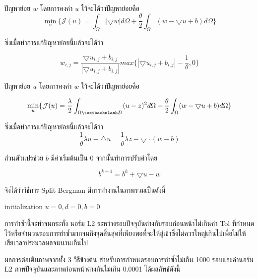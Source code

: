 \documentclass[hidelinks,a4paper,14pt]{article}
\numberwithin{equation}{section}							%
\begin{document}
{ปัญหาย่อย $w$ โดยการคงค่า $u$ ไว้จะได้ว่าปัญหาย่อยคือ
$$\min_{u} \{ \mathcal{J}(u) =  \int_{\Omega}  |\bigtriangledown w|  d\Omega + \frac{\theta}{2} \int_{\Omega} (w - \bigtriangledown u + b) d\Omega \}$$

ซึ่งเมื่อทำการแก้ปัญหาย่อยนี้แล้วจะได้ว่า

$$ w_{i,j} = \frac{\bigtriangledown u_{i,j}  + b_{i,j} }{ | \bigtriangledown u_{i,j}  + b_{i,j} | } max \{  | \bigtriangledown u_{i,j}  + b_{i,j} | - \frac{1}{\theta} , 0\} $$

ปัญหาย่อย $u$ โดยการคงค่า $w$ ไว้จะได้ว่าปัญหาย่อยคือ

$$\min_{u} \{ \mathcal{J}(u) = \frac{\lambda}{2} \int_{\Omega \textbackslash D} (u-z)^2 d\Omega + \frac{\theta}{2} \int_{\Omega} (w - \bigtriangledown u + b) d\Omega \}$$

ซึ่งเมื่อทำการแก้ปัญหาย่อยนี้แล้วจะได้ว่า
$$ \frac{1}{\theta}\lambda u - \bigtriangleup u = \frac{1}{\theta} \lambda z - \bigtriangledown \cdot (w-b) $$

ส่วนตัวแปรช่วย $b$ มีค่าเริ่มต้นเป็น 0 จากนั้นทำการปรับค่าโดย

$$ b^{k+1} = b^k  + \bigtriangledown u - w $$

จึงได้ว่าวิธีการ Split Bergman มีการทำงานในภาพรวมเป็นดังนี้



\begin{algorithm}[H]
	\begin{framed}
		initialization $u = 0, d = 0, b = 0$\\
	\end{framed}
\end{algorithm}



การทำซ้ำนี้จะทำจนกระทั่ง นอร์ม L2 ระหว่างรอบปัจจุบันต่างกับรอบก่อนหน้าไม่เกินค่า Tol ที่กำหนดไว้หรือจำนวนรอบการทำซ้ำมากจนถึงจุดสิ้นสุดที่เพียงพอที่จะให้ลู่เข้าซึ่งไม่ควรใหญ่เกินไปเพื่อไม่ให้เสียเวลาประมวลผลจนนานเกินไป 

\hspace{1cm}ผลการต่อเติมภาพจากทั้ง 3 วิธีข้างต้น สำหรับการกำหนดรอบการทำซ้ำไม่เกิน 1000 รอบและค่านอร์ม L2 ภาพปัจจุบันและภาพก่อนหน้าต่างกันไม่เกิน 0.0001 ได้ผลลัพธ์ดังนี้

}
\end{document}
